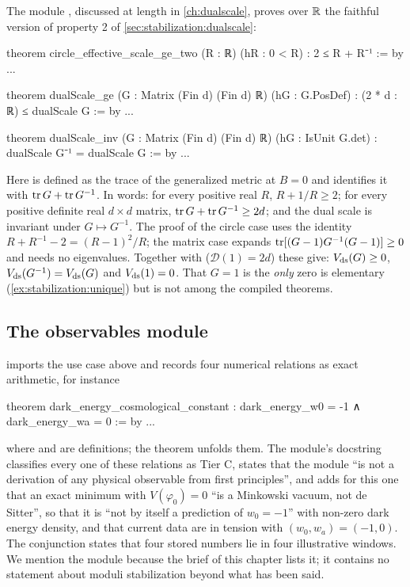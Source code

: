 The module , discussed at length in
\cref{ch:dualscale}, proves over $\mathbb{R}$ the faithful version of property 2 of
\cref{sec:stabilization:dualscale}:
\begin{leancode}
theorem circle_effective_scale_ge_two (R : ℝ) (hR : 0 < R) :
    2 ≤ R + R⁻¹ := by ...

theorem dualScale_ge (G : Matrix (Fin d) (Fin d) ℝ) (hG : G.PosDef) :
    (2 * d : ℝ) ≤ dualScale G := by ...

theorem dualScale_inv (G : Matrix (Fin d) (Fin d) ℝ) (hG : IsUnit G.det) :
    dualScale G⁻¹ = dualScale G := by ...
\end{leancode}
Here  is defined as the trace of the generalized metric at $B=0$ and
 identifies it with $\operatorname{tr} G+\operatorname{tr} G^{-1}$. In words: for every positive real
$R$, $R+1/R\ge2$; for every positive definite real $d\times d$ matrix,
$\operatorname{tr} G+\operatorname{tr} G^{-1}\ge2d$; and the dual scale is invariant under $G\mapsto G^{-1}$. The proof of
the circle case uses the identity $R+R^{-1}-2=(R-1)^2/R$; the matrix case expands
$\operatorname{tr}[(G-1)G^{-1}(G-1)]\ge0$ and needs no eigenvalues. Together with 
($\mathcal D(1)=2d$) these give: $V_{\rm ds}(G)\ge0$, $V_{\rm ds}(G^{-1})=V_{\rm ds}(G)$ and
$V_{\rm ds}(1)=0$. That $G=1$ is the \emph{only} zero is elementary (\cref{ex:stabilization:unique})
but is not among the compiled theorems.

\subsection{The observables module}

 imports the use case above and records four
numerical relations as exact arithmetic, for instance
\begin{leancode}
theorem dark_energy_cosmological_constant :
    dark_energy_w0 = -1 ∧ dark_energy_wa = 0 := by ...
\end{leancode}
where  and  are
definitions; the theorem unfolds them. The module's docstring classifies every one of these
relations as Tier C, states that the module ``is not a derivation of any physical observable
from first principles'', and adds for this one that an exact minimum with $V(\varphi_0)=0$ ``is
a Minkowski vacuum, not de Sitter'', so that it is ``not by itself a prediction of
$w_0=-1$'' with non-zero dark energy density, and that current data are in tension with
$(w_0,w_a)=(-1,0)$. The conjunction  states that
four stored numbers lie in four illustrative windows. We mention the module because the brief
of this chapter lists it; it contains no statement about moduli stabilization beyond what
has been said.

